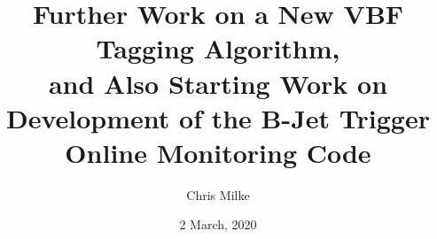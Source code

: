 \documentclass{beamer}
\begin{document}
    \title{Further Work on a New VBF Tagging Algorithm,\\ and Also Starting Work on Development of the B-Jet Trigger Online Monitoring Code}
    \author{Chris Milke}
    \date{2 March, 2020}

    \frame{\titlepage}




    

    
    
\end{document}

